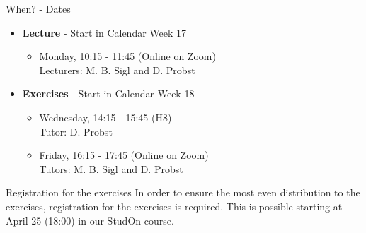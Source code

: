 \begin{frame}{When? - Dates}
	\begin{itemize}
		\item \textbf{Lecture} - Start in Calendar Week 17
		      \begin{itemize}
			      \item Monday, 10:15 - 11:45 (Online on Zoom) \\
			            {\color{gray}Lecturers: M. B. Sigl and D. Probst}
		      \end{itemize}
		\item \textbf{Exercises} - Start in Calendar Week 18
		      \begin{itemize}
			      \item Wednesday, 14:15 - 15:45 (H8) \\
			            {\color{gray}Tutor: D. Probst}
			      \item Friday, 16:15 - 17:45 (Online on Zoom) \\
			            {\color{gray}Tutors: M. B. Sigl and D. Probst}
		      \end{itemize}
	\end{itemize}

	\begin{block}{Registration for the exercises}
		In order to ensure the most even distribution to the exercises, registration for the exercises is required. This is possible starting at April 25 (18:00) in our StudOn course.
	\end{block}
\end{frame}

